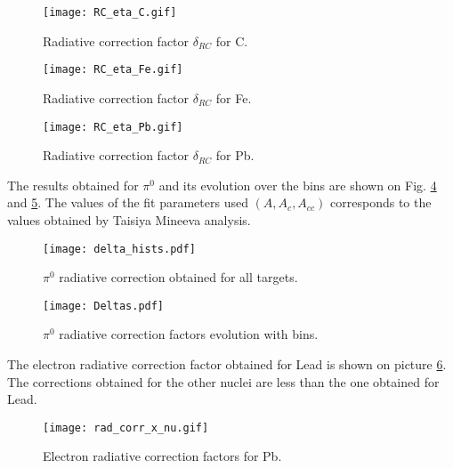 \begin{figure}[H]
\centering
\texttt{[image: RC\_eta\_C.gif]}
\caption{Radiative correction factor $\delta_{RC}$ for C.}
\label{fig:RC_eta_C}
\end{figure}


\begin{figure}[H]
\centering
\texttt{[image: RC\_eta\_Fe.gif]}
\caption{Radiative correction factor $\delta_{RC}$ for Fe.}
\label{fig:RC_eta_Fe}
\end{figure}


\begin{figure}[H]
\centering
\texttt{[image: RC\_eta\_Pb.gif]}
\caption{Radiative correction factor $\delta_{RC}$ for Pb.}
\label{fig:RC_eta_Pb}
\end{figure}

The results obtained for $\pi^0$ and its evolution over the bins are shown on Fig. \ref{fig:RC_pi0_hist} and \ref{fig:RC_pi0_bin}. The values of the fit parameters used $(A,A_{c},A_{cc})$ corresponds to the values obtained by Taisiya Mineeva analysis.  

\begin{figure}[H]
\centering
\texttt{[image: delta\_hists.pdf]}
\caption{$\pi^0$ radiative correction obtained for all targets.}
\label{fig:RC_pi0_hist}
\end{figure}

\begin{figure}[H]
\centering
\texttt{[image: Deltas.pdf]}
\caption{$\pi^0$ radiative correction factors evolution with bins.}
\label{fig:RC_pi0_bin}
\end{figure}

The electron radiative correction factor obtained for Lead is shown on picture \ref{fig:RC_e}.  The corrections obtained for the other nuclei are less than the one obtained for Lead.

\begin{figure}[H]
\centering
\texttt{[image: rad\_corr\_x\_nu.gif]}
\caption{Electron radiative correction factors for Pb.}
\label{fig:RC_e}
\end{figure}
 
